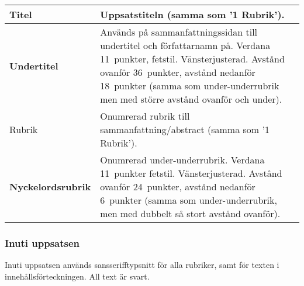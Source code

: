 \begin{longtable}{p{} p{}}
  \toprule
  {\sffamily\Large{}Titel} &
  Uppsatstiteln (samma som '1 Rubrik').
  \\
  \midrule
  {\sffamily\textbf{Undertitel}} &
  Används på sammanfattningssidan till undertitel och författarnamn på.
  Verdana 11~punkter, fetstil. Vänsterjusterad.
  Avstånd ovanför 36~punkter, avstånd nedanför 18~punkter (samma som
  under-underrubrik men med större avstånd ovanför och under).
  \\
  \midrule
  {\sffamily\Large{}Rubrik} &
  Onumrerad rubrik till sammanfattning/abstract
  (samma som '1 Rubrik').
  \\
  \midrule
  {\sffamily\textbf{Nyckelordsrubrik}} &
  Onumrerad under-underrubrik. Verdana 11~punkter fetstil. Vänsterjusterad.
  Avstånd ovanför 24~punkter, avstånd nedanför 6~punkter (samma som
  under-underrubrik, men med dubbelt så stort avstånd ovanför).
  \\
  \bottomrule
\end{longtable}


\subsubsection{Inuti uppsatsen}

Inuti uppsatsen används sansserifftypsnitt för alla rubriker, samt för texten i
innehållsförteckningen. All text är svart.

